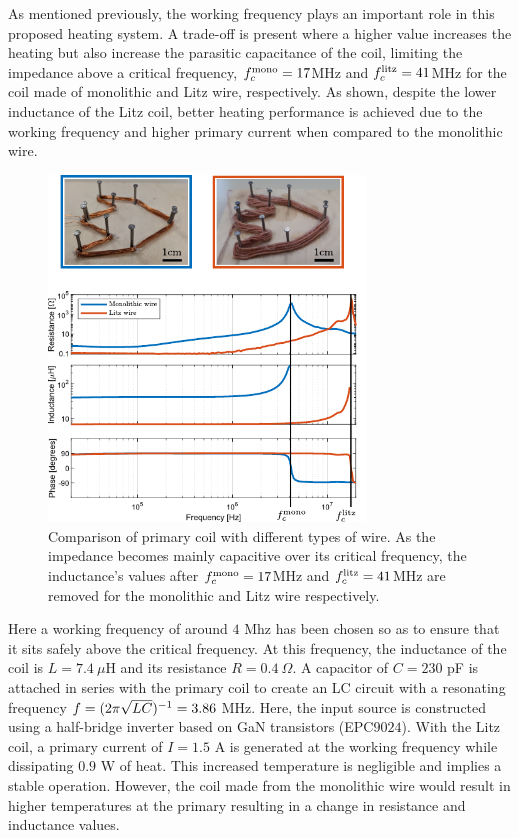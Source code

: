 As mentioned previously, the working frequency plays an important role in this proposed heating system. A trade-off is present where a higher value increases the heating but also increase the parasitic capacitance of the coil, limiting the impedance above a critical frequency, $f_c^\text{mono}=17$MHz and $f_c^\text{litz}=41$MHz for the coil made of monolithic and Litz wire, respectively. As shown, despite the lower inductance of the Litz coil, better heating performance is achieved due to the working frequency and higher primary current when compared to the monolithic wire.

\begin{figure}[t]
    \centering
    \includegraphics[width=0.75\textwidth]{images/chap5/10_final_Coil_BodeDiagram_2.pdf}
    \caption{Comparison of primary coil with different types of wire. As the impedance becomes mainly capacitive over its critical frequency, the inductance's values after $f_c^\text{mono} = 17$MHz and $f_c^\text{litz}  = 41$MHz are removed for the monolithic and Litz wire respectively.}
    \label{fig:induction-coil-freq}
\end{figure}

Here a working frequency of around $4$ Mhz has been chosen so as to ensure that it sits safely above the critical frequency. At this frequency, the inductance of the coil is $L=7.4~\mu$H and its resistance $R=0.4~\Omega$. A capacitor of $C = 230$ pF is attached in series with the primary coil to create an LC circuit with a resonating frequency $f=(2\pi\sqrt{LC})^{-1} = 3.86$ MHz. Here, the input source is constructed using a half-bridge inverter based on GaN transistors (EPC$9024$). With the Litz coil, a primary current of $I= 1.5$ A is generated at the working frequency while dissipating $0.9$ W of heat. This increased temperature is negligible and implies a stable operation. However, the coil made from the monolithic wire would result in higher temperatures at the primary resulting in a change in resistance and inductance values.

